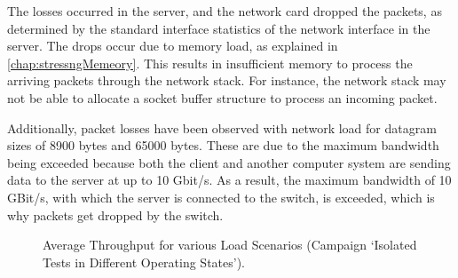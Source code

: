 The losses occurred in the server, and the network card dropped the packets, as determined by the standard interface statistics of the network interface in the server. The drops occur due to memory load, as explained in \ref{chap:stressngMemeory}. This results in insufficient memory to process the arriving packets through the network stack. For instance, the network stack may not be able to allocate a socket buffer structure to process an incoming packet.

Additionally, packet losses have been observed with network load for datagram sizes of 8900 bytes and 65000 bytes. These are due to the maximum bandwidth being exceeded because both the client and another computer system are sending data to the server at up to 10 Gbit/s. As a result, the maximum bandwidth of 10 GBit/s, with which the server is connected to the switch, is exceeded, which is why packets get dropped by the switch.

\begin{figure}[htbp]
  \centering
  \caption{Average Throughput for various Load Scenarios (Campaign `Isolated Tests in Different Operating States').}
  \label{fig:resuc2}
\end{figure}

